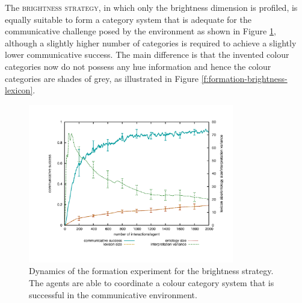 The \textsc{brightness strategy}, in which only the brightness dimension
is profiled, is equally suitable to form a category system that is
adequate for the communicative challenge posed by the environment as
shown in Figure \ref{f:formation-brightness-dynamics}, although a
slightly higher number of categories is required to achieve a slightly
lower communicative success. The main difference is that the invented
colour categories now do not possess any hue information and hence the
colour categories are shades of grey, as illustrated in Figure
\ref{f:formation-brightness-lexicon}.

\begin{figure}[p]
  \begin{center}
    \includegraphics[width=0.8\textwidth]{./basic-operators/figures/formation-brightness.pdf}
    \caption[Dynamics of the formation experiment for the brightness
    strategy]{Dynamics of the formation experiment for the brightness
      strategy. The agents are able to coordinate a colour category
      system that is successful in the communicative environment.}
    \label{f:formation-brightness-dynamics}
  \end{center}
\end{figure}

